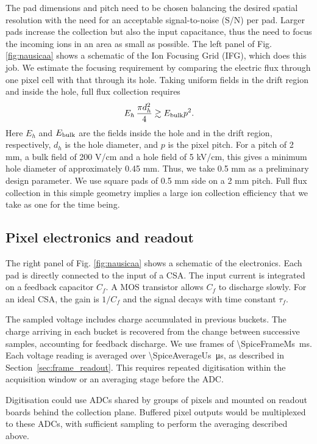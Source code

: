 \documentclass[pdflatex,iicol,sn-mathphys-num]{sn-jnl}
\begin{document}
The pad dimensions and pitch need to be chosen balancing the desired spatial resolution with the need for an acceptable signal-to-noise (S/N) per pad. Larger pads increase the collection but also the input capacitance, thus the need to focus the incoming ions in an area as small as possible. The left panel of Fig. \ref{fig:nausicaa} shows a schematic of the Ion Focusing Grid (IFG), which does this job.  We estimate the focusing requirement by comparing the electric flux through one pixel cell with that through its hole. Taking uniform fields in the drift region and inside the hole, full flux collection requires
\[
E_h\,\frac{\pi d_h^2}{4}\gtrsim E_{\rm bulk}p^2.
\]
Here $E_h$ and $E_{\rm bulk}$ are the fields inside the hole and in the drift region, respectively, $d_h$ is the hole diameter, and $p$ is the pixel pitch.
For a pitch of 2 mm, a bulk field of 200 V/cm and a hole field of 5 kV/cm, this gives a minimum hole diameter of approximately 0.45 mm. Thus, we take 0.5 mm as a preliminary design parameter. We use square pads of 0.5 mm side on a 2 mm pitch. Full flux collection in this simple geometry implies a large ion collection efficiency that we take as one for the time being.


\subsection{Pixel electronics and readout}

The right panel of Fig. \ref{fig:nausicaa} shows a schematic of the electronics. Each pad is directly connected to the input of a CSA. The input current is integrated on a feedback capacitor $C_f$. A MOS transistor allows $C_f$ to discharge slowly. For an ideal CSA, the gain is $1/C_f$ and the signal decays with time constant $\tau_f$.


The sampled voltage includes charge accumulated in previous buckets. The charge arriving in each bucket is recovered from the change between successive samples, accounting for feedback discharge. We use frames of \SI{\SpiceFrameMs}{ms}. Each voltage reading is averaged over \SI{\SpiceAverageUs}{\micro\second}, as described in Section~\ref{sec:frame_readout}. This requires repeated digitisation within the acquisition window or an averaging stage before the ADC.

Digitisation could use ADCs shared by groups of pixels and mounted on readout boards behind the collection plane. Buffered pixel outputs would be multiplexed to these ADCs, with sufficient sampling to perform the averaging described above.
\end{document}
